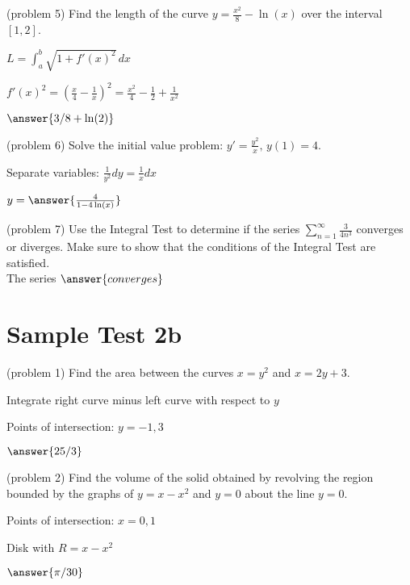 \documentclass[handout]{ximera}
\begin{document}
\begin{problem}(problem 5)
Find the length of the curve $\displaystyle y = \frac{x^2}{8} - \ln(x)$ over the interval $[1, 2]$.\\
\begin{hint}
$L = \int_a^b \sqrt{1 + f'(x)^2} \, dx$
\end{hint}
\begin{hint}
$\displaystyle f'(x)^2 =\left(\frac{x}{4} - \frac{1}{x}\right)^2 
= \frac{x^2}{4} - \frac{1}{2} + \frac{1}{x^2}$
\end{hint}
$\answer{3/8 + \ln(2)}$
\end{problem}


\begin{problem}(problem 6)
Solve the initial value problem: $\displaystyle y' = \frac{y^2}{x},\, y(1) = 4$.\\
\begin{hint}
Separate variables: $\frac{1}{y^2} dy = \frac{1}{x} dx$
\end{hint}
$y = \answer{\frac{4}{1- 4\ln(x)}}$
\end{problem}


\begin{problem}(problem 7)
Use the Integral Test to determine if the series $\displaystyle \sum_{n=1}^\infty \frac{3}{4n^3}$
converges or diverges. Make sure to show that the
conditions of the Integral Test are satisfied.\\
The series $\answer{converges}$
\end{problem}

\section{Sample Test 2b}

\begin{problem}(problem 1)
Find the area between the curves $x = y^2$ and $x = 2y + 3$.\\
\begin{hint}
Integrate right curve minus left curve with respect to $y$
\end{hint}
\begin{hint}
Points of intersection: $y = -1, 3$
\end{hint}
$\answer{25/3}$
\end{problem}


\begin{problem}(problem 2)
Find the volume of the solid obtained by revolving the region bounded by the 
graphs of $y = x-x^2$ and $y = 0$ about the line $ y = 0$.\\
\begin{hint}
Points of intersection: $x = 0, 1$
\end{hint}
\begin{hint}
Disk with $R = x - x^2$
\end{hint}

$\answer{\pi/30}$
\end{problem}
\end{document}
